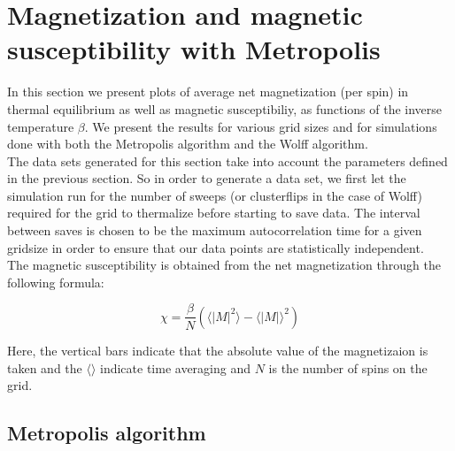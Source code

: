 \documentclass[11pt,a4paper]{article}
\begin{document}
\pagebreak





\section{Magnetization and magnetic susceptibility with Metropolis}

In this section we present plots of average net magnetization (per spin) in thermal equilibrium as well as magnetic
 susceptibiliy, as functions of the inverse temperature $\beta$. We present the results for various grid sizes and for
 simulations done with both the Metropolis algorithm and the Wolff algorithm. \\

The data sets generated for this section take into account the parameters defined in the previous section. So in order to
 generate a data set, we first let the simulation run for the number of sweeps (or clusterflips in the case of Wolff) required
 for the grid to thermalize before starting to save data. The interval between saves is chosen to be the maximum autocorrelation
 time for a given gridsize in order to ensure that our data points are statistically independent. \\

The magnetic susceptibility is obtained from the net magnetization through the following formula:


\begin{equation*}
  \chi = \frac{\beta}{N} (\langle |M|^2 \rangle - \langle |M| \rangle^2)
\end{equation*}

Here, the vertical bars indicate that the absolute value of the magnetizaion is taken and the $\langle \rangle$ indicate time
 averaging and $N$ is the number of spins on the grid. 




 

\subsection{Metropolis algorithm}
\end{document}
